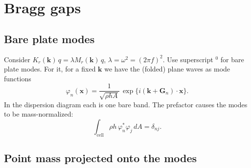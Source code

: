 
\providecommand{\fixed}[1]{{\color{blue!70!black}#1}}
\providecommand{\corr}[1]{\marginpar{\raggedright\footnotesize\color{red!70!black}#1}}

\chapter{Bragg gaps}
\label{ch:bragg_gaps}

\section{Bare plate modes}

Consider $K_r(\mathbf{k})\,q = \lambda M_r(\mathbf{k})\,q$,
$\lambda = \omega^2 = (2\pi f)^2$.
Use superscript ${}^0$ for bare plate modes. For it, for a fixed $\mathbf{k}$ we
have the (folded) plane waves as mode functions
\begin{equation}
  \varphi_n(\mathbf{x}) = \frac{1}{\sqrt{\rho h A}}\,
  \exp\bigl\{i(\mathbf{k} + \mathbf{G}_n)\cdot\mathbf{x}\bigr\} .
\end{equation}
In the dispersion diagram each is one bare band.
The prefactor causes the modes to be mass-normalized:
\begin{equation}
  \int_\text{cell} \rho h\, \varphi_n^* \varphi_j \, dA = \delta_{nj} .
\end{equation}

\section{Point mass projected onto the modes}


